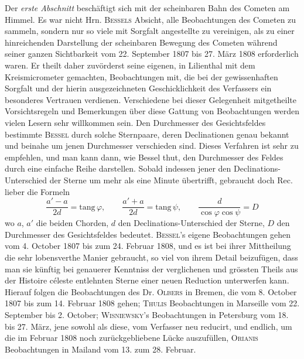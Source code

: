 Der \emph{erste Abschnitt} beschäftigt sich mit der scheinbaren Bahn des Cometen am Himmel. Es war nicht Hrn. \textsc{Bessels} Absicht, alle Beobachtungen des Cometen zu sammeln, sondern nur so viele mit Sorgfalt angestellte zu vereinigen, als zu einer hinreichenden Darstellung der scheinbaren Bewegung des Cometen während seiner ganzen Sichtbarkeit vom 22. September 1807 bis 27. März 1808 erforderlich waren. Er theilt daher zuvörderst seine eigenen, in Lilienthal mit dem Kreismicrometer gemachten, Beobachtungen mit, die bei der gewissenhaften Sorgfalt und der hierin ausgezeichneten Geschicklichkeit des Verfassers ein besonderes Vertrauen verdienen. Verschiedene bei dieser Gelegenheit mitgetheilte Vorsichtsregeln und Bemerkungen über diese Gattung von Beobachtungen werden vielen Lesern sehr willkommen sein. Den Durchmesser des Gesichtsfeldes bestimmte \textsc{Bessel} durch solche Sternpaare, deren Declinationen genau bekannt und beinahe um jenen Durchmesser verschieden sind. Dieses Verfahren ist sehr zu empfehlen, und man kann dann, wie Bessel thut, den Durchmesser des Feldes durch eine einfache Reihe darstellen. Sobald indessen jener den Declinations-Unterschied der Sterne um mehr als eine Minute übertrifft, gebraucht doch Rec. lieber die Formeln \[
\frac{a'-a}{2d}=\mathrm{tang}\,\varphi,\qquad \frac{a'+a}{2d}=\mathrm{tang}\,\psi,\qquad \frac{d}{\cos\varphi\cos\psi}=D
\] wo $a$, $a'$ die beiden Chorden, $d$ den Declinations-Unterschied der Sterne, $D$ den Durchmesser des Gesichtsfeldes bedeutet. \textsc{Bessel}'s eigene Beobachtungen gehen vom 4. October 1807 bis zum 24. Februar 1808, und es ist bei ihrer Mittheilung die sehr lobensverthe Manier gebraucht, so viel von ihrem Detail beizufügen, dass man sie künftig bei genauerer Kenntniss der verglichenen und grössten Theils aus der Histoire céleste entlehnten Sterne einer neuen Reduction unterwerfen kann. Hierauf folgen die Beobachtungen des Dr. \textsc{Olbers} in Bremen, die vom 8. October 1807 bis zum 14. Februar 1808 gehen; \textsc{Thulis} Beobachtungen in Marseille vom 22. September bis 2. October; \textsc{Wisniewsky}'s Beobachtungen in Petersburg vom 18. bis 27. März, jene sowohl als diese, vom Verfasser neu reducirt, und endlich, um die im Februar 1808 noch zurückgebliebene Lücke auszufüllen, \textsc{Orianis} Beobachtungen in Mailand vom 13. zum 28. Februar.

